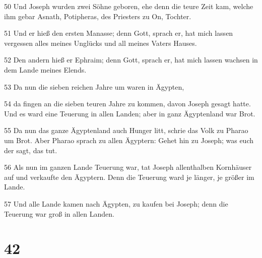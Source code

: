 \par 50 Und Joseph wurden zwei Söhne geboren, ehe denn die teure Zeit kam, welche ihm gebar Asnath, Potipheras, des Priesters zu On, Tochter.
\par 51 Und er hieß den ersten Manasse; denn Gott, sprach er, hat mich lassen vergessen alles meines Unglücks und all meines Vaters Hauses.
\par 52 Den andern hieß er Ephraim; denn Gott, sprach er, hat mich lassen wachsen in dem Lande meines Elends.
\par 53 Da nun die sieben reichen Jahre um waren in Ägypten,
\par 54 da fingen an die sieben teuren Jahre zu kommen, davon Joseph gesagt hatte. Und es ward eine Teuerung in allen Landen; aber in ganz Ägyptenland war Brot.
\par 55 Da nun das ganze Ägyptenland auch Hunger litt, schrie das Volk zu Pharao um Brot. Aber Pharao sprach zu allen Ägyptern: Gehet hin zu Joseph; was euch der sagt, das tut.
\par 56 Als nun im ganzen Lande Teuerung war, tat Joseph allenthalben Kornhäuser auf und verkaufte den Ägyptern. Denn die Teuerung ward je länger, je größer im Lande.
\par 57 Und alle Lande kamen nach Ägypten, zu kaufen bei Joseph; denn die Teuerung war groß in allen Landen.

\chapter{42}

